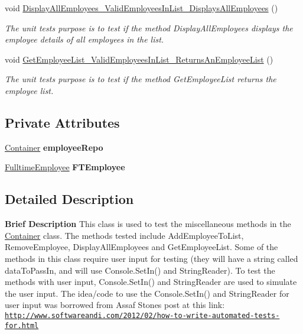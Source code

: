 \begin{DoxyCompactItemize}
void \hyperlink{class_the_company_1_1_tests_1_1_other_tests_a4173aa7634a92048d0afda36c89f7e55}{Display\+All\+Employees\+\_\+\+Valid\+Employees\+In\+List\+\_\+\+Displays\+All\+Employees} ()
\begin{DoxyCompactList}\small\item\em The unit test\textquotesingle{}s purpose is to test if the method Display\+All\+Employees displays the employee details of all employees in the list. \end{DoxyCompactList}\item 
void \hyperlink{class_the_company_1_1_tests_1_1_other_tests_a3809d7035a2570bae67b7b9610f5c96f}{Get\+Employee\+List\+\_\+\+Valid\+Employees\+In\+List\+\_\+\+Returns\+An\+Employee\+List} ()
\begin{DoxyCompactList}\small\item\em The unit test\textquotesingle{}s purpose is to test if the method Get\+Employee\+List returns the employee list. \end{DoxyCompactList}\end{DoxyCompactItemize}
\subsection*{Private Attributes}
\begin{DoxyCompactItemize}
\item 
\hypertarget{class_the_company_1_1_tests_1_1_other_tests_a76b4c4cdea3948df680a9cafbd75ebd0}{}\hyperlink{class_the_company_1_1_container}{Container} {\bfseries employee\+Repo}\label{class_the_company_1_1_tests_1_1_other_tests_a76b4c4cdea3948df680a9cafbd75ebd0}

\item 
\hypertarget{class_the_company_1_1_tests_1_1_other_tests_a1b44fe8f452b8c4116dbcde629dc0d65}{}\hyperlink{class_all_employees_1_1_fulltime_employee}{Fulltime\+Employee} {\bfseries F\+T\+Employee}\label{class_the_company_1_1_tests_1_1_other_tests_a1b44fe8f452b8c4116dbcde629dc0d65}

\end{DoxyCompactItemize}


\subsection{Detailed Description}
{\bfseries  Brief Description} This class is used to test the miscellaneous methods in the \hyperlink{class_the_company_1_1_container}{Container} class. The methods tested include Add\+Employee\+To\+List, Remove\+Employee, Display\+All\+Employees and Get\+Employee\+List. Some of the methods in this class require user input for testing (they will have a string called data\+To\+Pass\+In, and will use Console.\+Set\+In() and String\+Reader). To test the methods with user input, Console.\+Set\+In() and String\+Reader are used to simulate the user input. The idea/code to use the Console.\+Set\+In() and String\+Reader for user input was borrowed from Assaf Stone\textquotesingle{}s post at this link\+: \href{http://www.softwareandi.com/2012/02/how-to-write-automated-tests-for.html}{\tt http\+://www.\+softwareandi.\+com/2012/02/how-\/to-\/write-\/automated-\/tests-\/for.\+html} 


